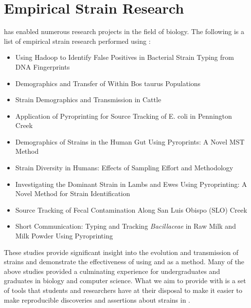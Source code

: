 \section{Empirical Strain Research}
\cplop{} has enabled numerous research projects in the field of biology.
The following is a list of empirical strain research performed using \cplop{}:
\begin{itemize}
    \item Using Hadoop to Identify False Positives in Bacterial Strain Typing from DNA Fingerprints \cite{adams2016using}
    \item Demographics and Transfer of \ecoli{} Within Bos taurus Populations \cite{dillard2015demographics}
    \item \ecoli{} Strain Demographics and Transmission in Cattle \cite{dillard2013coli}
    \item Application of Pyroprinting for Source Tracking of E. coli in Pennington Creek \cite{moritz2015application}
    \item Demographics of \ecoli{} Strains in the Human Gut Using Pyroprints:  A Novel MST Method \cite{neal2012demographics}
    \item \ecolilong{} Strain Diversity in Humans: Effects of Sampling Effort and Methodology \cite{neal2013escherichia}
    \item Investigating the Dominant \ecolilong{} Strain in Lambs and Ewes Using Pyroprinting:  A Novel Method for Strain Identification \cite{nguyeninvestigating}
    \item Source Tracking of Fecal Contamination Along San Luis Obispo (SLO) Creek \cite{shapiro2015source}
    \item Short Communication:  Typing and Tracking \textit{Bacillaceae} in Raw Milk and Milk Powder Using Pyroprinting \cite{vanderkelen2016short}
\end{itemize}

These studies provide significant insight into the evolution and transmission of \ecoli{} strains and demonstrate the effectiveness of using \pyros{} and \cplop{} as a \mst{} method.
Many of the above studies provided a culminating experience for undergraduates and graduates in biology and computer science.
What we aim to provide with \krap{} is a set of tools that students and researchers have at their disposal to make it easier to make reproducible discoveries and assertions about strains in \cplop{}.

